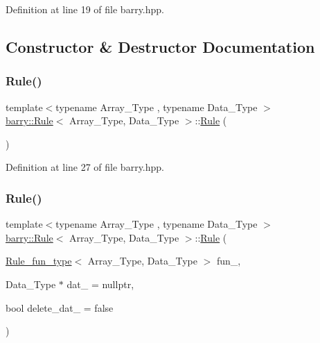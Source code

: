 Definition at line 19 of file barry.\+hpp.



\subsection{Constructor \& Destructor Documentation}
\mbox{\label{classbarry_1_1_rule_aa9d79df22874f000c8f4dd46b58cc157}} 
\subsubsection{\texorpdfstring{Rule()}{Rule()}\hspace{0.1cm}{\footnotesize\ttfamily [1/2]}}
{\footnotesize\ttfamily template$<$typename Array\+\_\+\+Type , typename Data\+\_\+\+Type $>$ \\
\hyperlink{classbarry_1_1_rule}{barry\+::\+Rule}$<$ Array\+\_\+\+Type, Data\+\_\+\+Type $>$\+::\hyperlink{classbarry_1_1_rule}{Rule} (\begin{DoxyParamCaption}{ }\end{DoxyParamCaption})\hspace{0.3cm}{\ttfamily [inline]}}



Definition at line 27 of file barry.\+hpp.

\mbox{\label{classbarry_1_1_rule_a2d63309b0ff8cd5d2c4827b9daf03b3a}} 
\subsubsection{\texorpdfstring{Rule()}{Rule()}\hspace{0.1cm}{\footnotesize\ttfamily [2/2]}}
{\footnotesize\ttfamily template$<$typename Array\+\_\+\+Type , typename Data\+\_\+\+Type $>$ \\
\hyperlink{classbarry_1_1_rule}{barry\+::\+Rule}$<$ Array\+\_\+\+Type, Data\+\_\+\+Type $>$\+::\hyperlink{classbarry_1_1_rule}{Rule} (\begin{DoxyParamCaption}\item[{\hyperlink{namespacebarry_aefd7e6d4ba228e2ce1074d075c512178}{Rule\+\_\+fun\+\_\+type}$<$ Array\+\_\+\+Type, Data\+\_\+\+Type $>$}]{fun\+\_\+,  }\item[{Data\+\_\+\+Type $\ast$}]{dat\+\_\+ = {\ttfamily nullptr},  }\item[{bool}]{delete\+\_\+dat\+\_\+ = {\ttfamily false} }\end{DoxyParamCaption})\hspace{0.3cm}{\ttfamily [inline]}}



